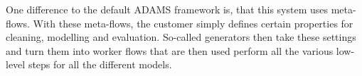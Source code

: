 \documentclass[wcp]{jmlr}
\begin{document}
One difference to the default ADAMS framework is, that this system uses meta-flows. With these meta-flows, the customer simply defines certain properties for cleaning, modelling and evaluation. So-called generators then take these settings and turn them into worker flows that are then used perform all the various low-level steps for all the different models.



\end{document}
